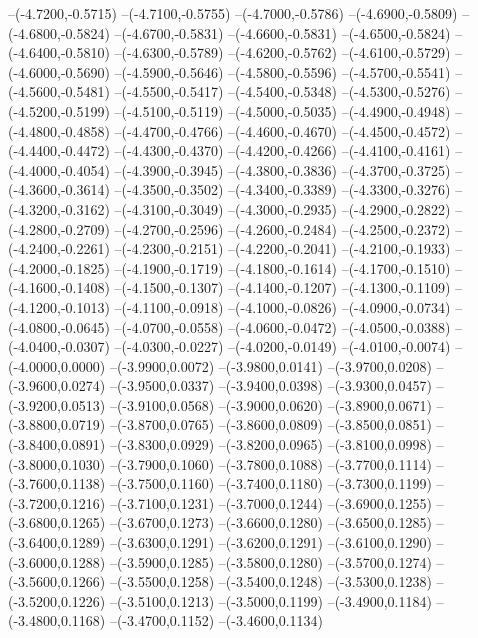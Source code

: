 	--(-4.7200,-0.5715)
	--(-4.7100,-0.5755)
	--(-4.7000,-0.5786)
	--(-4.6900,-0.5809)
	--(-4.6800,-0.5824)
	--(-4.6700,-0.5831)
	--(-4.6600,-0.5831)
	--(-4.6500,-0.5824)
	--(-4.6400,-0.5810)
	--(-4.6300,-0.5789)
	--(-4.6200,-0.5762)
	--(-4.6100,-0.5729)
	--(-4.6000,-0.5690)
	--(-4.5900,-0.5646)
	--(-4.5800,-0.5596)
	--(-4.5700,-0.5541)
	--(-4.5600,-0.5481)
	--(-4.5500,-0.5417)
	--(-4.5400,-0.5348)
	--(-4.5300,-0.5276)
	--(-4.5200,-0.5199)
	--(-4.5100,-0.5119)
	--(-4.5000,-0.5035)
	--(-4.4900,-0.4948)
	--(-4.4800,-0.4858)
	--(-4.4700,-0.4766)
	--(-4.4600,-0.4670)
	--(-4.4500,-0.4572)
	--(-4.4400,-0.4472)
	--(-4.4300,-0.4370)
	--(-4.4200,-0.4266)
	--(-4.4100,-0.4161)
	--(-4.4000,-0.4054)
	--(-4.3900,-0.3945)
	--(-4.3800,-0.3836)
	--(-4.3700,-0.3725)
	--(-4.3600,-0.3614)
	--(-4.3500,-0.3502)
	--(-4.3400,-0.3389)
	--(-4.3300,-0.3276)
	--(-4.3200,-0.3162)
	--(-4.3100,-0.3049)
	--(-4.3000,-0.2935)
	--(-4.2900,-0.2822)
	--(-4.2800,-0.2709)
	--(-4.2700,-0.2596)
	--(-4.2600,-0.2484)
	--(-4.2500,-0.2372)
	--(-4.2400,-0.2261)
	--(-4.2300,-0.2151)
	--(-4.2200,-0.2041)
	--(-4.2100,-0.1933)
	--(-4.2000,-0.1825)
	--(-4.1900,-0.1719)
	--(-4.1800,-0.1614)
	--(-4.1700,-0.1510)
	--(-4.1600,-0.1408)
	--(-4.1500,-0.1307)
	--(-4.1400,-0.1207)
	--(-4.1300,-0.1109)
	--(-4.1200,-0.1013)
	--(-4.1100,-0.0918)
	--(-4.1000,-0.0826)
	--(-4.0900,-0.0734)
	--(-4.0800,-0.0645)
	--(-4.0700,-0.0558)
	--(-4.0600,-0.0472)
	--(-4.0500,-0.0388)
	--(-4.0400,-0.0307)
	--(-4.0300,-0.0227)
	--(-4.0200,-0.0149)
	--(-4.0100,-0.0074)
	--(-4.0000,0.0000)
	--(-3.9900,0.0072)
	--(-3.9800,0.0141)
	--(-3.9700,0.0208)
	--(-3.9600,0.0274)
	--(-3.9500,0.0337)
	--(-3.9400,0.0398)
	--(-3.9300,0.0457)
	--(-3.9200,0.0513)
	--(-3.9100,0.0568)
	--(-3.9000,0.0620)
	--(-3.8900,0.0671)
	--(-3.8800,0.0719)
	--(-3.8700,0.0765)
	--(-3.8600,0.0809)
	--(-3.8500,0.0851)
	--(-3.8400,0.0891)
	--(-3.8300,0.0929)
	--(-3.8200,0.0965)
	--(-3.8100,0.0998)
	--(-3.8000,0.1030)
	--(-3.7900,0.1060)
	--(-3.7800,0.1088)
	--(-3.7700,0.1114)
	--(-3.7600,0.1138)
	--(-3.7500,0.1160)
	--(-3.7400,0.1180)
	--(-3.7300,0.1199)
	--(-3.7200,0.1216)
	--(-3.7100,0.1231)
	--(-3.7000,0.1244)
	--(-3.6900,0.1255)
	--(-3.6800,0.1265)
	--(-3.6700,0.1273)
	--(-3.6600,0.1280)
	--(-3.6500,0.1285)
	--(-3.6400,0.1289)
	--(-3.6300,0.1291)
	--(-3.6200,0.1291)
	--(-3.6100,0.1290)
	--(-3.6000,0.1288)
	--(-3.5900,0.1285)
	--(-3.5800,0.1280)
	--(-3.5700,0.1274)
	--(-3.5600,0.1266)
	--(-3.5500,0.1258)
	--(-3.5400,0.1248)
	--(-3.5300,0.1238)
	--(-3.5200,0.1226)
	--(-3.5100,0.1213)
	--(-3.5000,0.1199)
	--(-3.4900,0.1184)
	--(-3.4800,0.1168)
	--(-3.4700,0.1152)
	--(-3.4600,0.1134)
